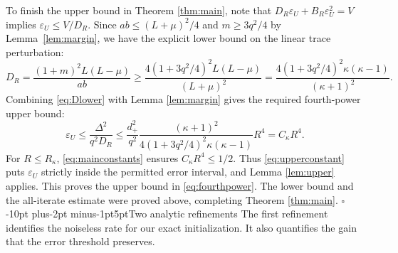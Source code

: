 \documentclass[pdflatex,sn-mathphys-num]{sn-jnl}
\makeatletter
\renewcommand\section{\@startsection{section}{1}{\z@}%
  {-10pt plus-2pt minus-1pt}{5pt}{\sectionfont}}
\theoremstyle{thmstyleone}
\theoremstyle{thmstyletwo}
\makeatother
\begin{document}
To finish the upper bound in Theorem \ref{thm:main}, note that
$D_R\varepsilon_U+B_R\varepsilon_U^2=V$ implies
$\varepsilon_U\leq V/D_R$.
Since $ab\leq(L+\mu)^2/4$ and $m\geq3q^2/4$ by
Lemma~\ref{lem:margin}, we have the
explicit lower bound on the linear trace perturbation:
\begin{equation}\label{eq:Dlower}
 D_R=\frac{(1+m)^2L(L-\mu)}{ab}
 \geq\frac{4(1+3q^2/4)^2L(L-\mu)}{(L+\mu)^2}
 =\frac{4(1+3q^2/4)^2\kappa(\kappa-1)}{(\kappa+1)^2}.
\end{equation}
Combining \eqref{eq:Dlower} with Lemma \ref{lem:margin} gives
the required fourth-power upper bound:
\begin{equation}\label{eq:upperconstant}
 \varepsilon_U\leq\frac{\Delta^2}{q^2D_R}
 \leq\frac{d_+^2}{q^2}
         \frac{(\kappa+1)^2}{4(1+3q^2/4)^2\kappa(\kappa-1)}R^4
 =C_\kappa R^4 .
\end{equation}
For $R\leq R_\kappa$, \eqref{eq:mainconstants} ensures
$C_\kappa R^4\leq1/2$. Thus \eqref{eq:upperconstant} puts
$\varepsilon_U$ strictly inside the permitted error interval,
and Lemma \ref{lem:upper} applies.
This proves the upper bound in \eqref{eq:fourthpower}.
The lower bound and the all-iterate estimate were proved above,
completing Theorem \ref{thm:main}. \hfill$\square$
\section{Two analytic refinements}\label{sec:refinements}
The first refinement identifies the noiseless rate for our exact
initialization. It also quantifies the gain that the error threshold
preserves.
\end{document}
